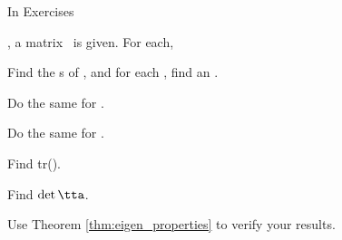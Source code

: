 {\noin In Exercises }
{, a matrix \tta\ is given. For each, 
\begin{list}{()}{}
\item Find the \el s of \tta, and for each \el, find an \ev.
\item	Do the same for \ttat.
\item	Do the same for \ttai.
\item	Find tr(\tta).
\item	Find $\det{\tta}$.
\end{list}
Use Theorem \ref{thm:eigen_properties} to verify your results.}
